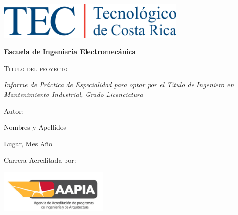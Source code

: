 \begin{titlepage}

\centering

{\includegraphics[width=0.7\textwidth]{01_preliminares/00_figuras/logo.png}\par}
\vspace{0.5cm}

{\bfseries\LARGE Escuela de Ingeniería Electromecánica\par}
\vspace{0.5cm}



\vfill

{\scshape\LARGE Título del proyecto \par}
\vspace{1cm}

{\itshape\Large Informe de Práctica de Especialidad para optar por el Título de
Ingeniero en Mantenimiento Industrial, Grado Licenciatura \par}
\vspace{1cm}

{\Large Autor: \par}
{\Large Nombres y Apellidos  \par}
\vspace{0.6cm}

{\Large Lugar, Mes Año \par}

\vspace{0.5cm}

{\Large Carrera Acreditada por: \par}
{\includegraphics[width=0.4\textwidth]{01_preliminares/00_figuras/AAPIA.png}\par}



\end{titlepage}

